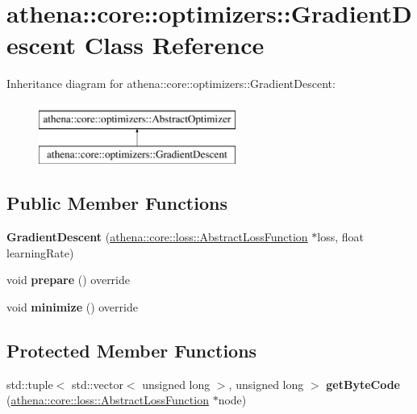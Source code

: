 \hypertarget{classathena_1_1core_1_1optimizers_1_1_gradient_descent}{}\section{athena\+:\+:core\+:\+:optimizers\+:\+:Gradient\+Descent Class Reference}
\label{classathena_1_1core_1_1optimizers_1_1_gradient_descent}
Inheritance diagram for athena\+:\+:core\+:\+:optimizers\+:\+:Gradient\+Descent\+:\begin{figure}[H]
\begin{center}
\leavevmode
\includegraphics[height=2.000000cm]{classathena_1_1core_1_1optimizers_1_1_gradient_descent}
\end{center}
\end{figure}
\subsection*{Public Member Functions}
\begin{DoxyCompactItemize}
\item 
\mbox{\label{classathena_1_1core_1_1optimizers_1_1_gradient_descent_a1f81ba3b4a6291f37a33f7eb903ecdfe}} 
{\bfseries Gradient\+Descent} (\mbox{\hyperlink{classathena_1_1core_1_1loss_1_1_abstract_loss_function}{athena\+::core\+::loss\+::\+Abstract\+Loss\+Function}} $\ast$loss, float learning\+Rate)
\item 
\mbox{\label{classathena_1_1core_1_1optimizers_1_1_gradient_descent_ab9ecd3b02a82c86bfaaa3d93789d2d5a}} 
void {\bfseries prepare} () override
\item 
\mbox{\label{classathena_1_1core_1_1optimizers_1_1_gradient_descent_a1403aaa8543b4f50e783ae19b26e2ea4}} 
void {\bfseries minimize} () override
\end{DoxyCompactItemize}
\subsection*{Protected Member Functions}
\begin{DoxyCompactItemize}
\item 
\mbox{\label{classathena_1_1core_1_1optimizers_1_1_gradient_descent_afadd2e418a6ed2a2b025b5cffdfa7d4c}} 
std\+::tuple$<$ std\+::vector$<$ unsigned long $>$, unsigned long $>$ {\bfseries get\+Byte\+Code} (\mbox{\hyperlink{classathena_1_1core_1_1loss_1_1_abstract_loss_function}{athena\+::core\+::loss\+::\+Abstract\+Loss\+Function}} $\ast$node)
\end{DoxyCompactItemize}
